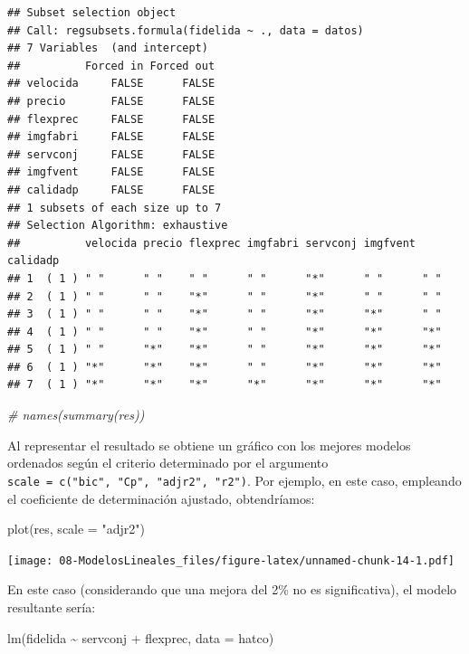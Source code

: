 \documentclass[
]{book}
\newenvironment{Shaded}{\begin{snugshade}}{\end{snugshade}}
\newcommand{\AttributeTok}[1]{\textcolor[rgb]{0.77,0.63,0.00}{#1}}
\newcommand{\CommentTok}[1]{\textcolor[rgb]{0.56,0.35,0.01}{\textit{#1}}}
\newcommand{\FunctionTok}[1]{\textcolor[rgb]{0.00,0.00,0.00}{#1}}
\newcommand{\NormalTok}[1]{#1}
\newcommand{\SpecialCharTok}[1]{\textcolor[rgb]{0.00,0.00,0.00}{#1}}
\newcommand{\StringTok}[1]{\textcolor[rgb]{0.31,0.60,0.02}{#1}}
\theoremstyle{break}
\theoremstyle{nonumberplain}
\begin{document}
\begin{verbatim}
## Subset selection object
## Call: regsubsets.formula(fidelida ~ ., data = datos)
## 7 Variables  (and intercept)
##          Forced in Forced out
## velocida     FALSE      FALSE
## precio       FALSE      FALSE
## flexprec     FALSE      FALSE
## imgfabri     FALSE      FALSE
## servconj     FALSE      FALSE
## imgfvent     FALSE      FALSE
## calidadp     FALSE      FALSE
## 1 subsets of each size up to 7
## Selection Algorithm: exhaustive
##          velocida precio flexprec imgfabri servconj imgfvent calidadp
## 1  ( 1 ) " "      " "    " "      " "      "*"      " "      " "     
## 2  ( 1 ) " "      " "    "*"      " "      "*"      " "      " "     
## 3  ( 1 ) " "      " "    "*"      " "      "*"      "*"      " "     
## 4  ( 1 ) " "      " "    "*"      " "      "*"      "*"      "*"     
## 5  ( 1 ) " "      "*"    "*"      " "      "*"      "*"      "*"     
## 6  ( 1 ) "*"      "*"    "*"      " "      "*"      "*"      "*"     
## 7  ( 1 ) "*"      "*"    "*"      "*"      "*"      "*"      "*"
\end{verbatim}

\begin{Shaded}
\begin{Highlighting}[]
\CommentTok{\# names(summary(res))}
\end{Highlighting}
\end{Shaded}

Al representar el resultado se obtiene un gráfico con los mejores modelos ordenados
según el criterio determinado por el argumento \texttt{scale\ =\ c("bic",\ "Cp",\ "adjr2",\ "r2")}.
Por ejemplo, en este caso, empleando el coeficiente de determinación ajustado, obtendríamos:

\begin{Shaded}
\begin{Highlighting}[]
\FunctionTok{plot}\NormalTok{(res, }\AttributeTok{scale =} \StringTok{"adjr2"}\NormalTok{)}
\end{Highlighting}
\end{Shaded}

\texttt{[image: 08-ModelosLineales\_files/figure-latex/unnamed-chunk-14-1.pdf]}

En este caso (considerando que una mejora del 2\% no es significativa), el modelo resultante sería:

\begin{Shaded}
\begin{Highlighting}[]
\FunctionTok{lm}\NormalTok{(fidelida }\SpecialCharTok{\textasciitilde{}}\NormalTok{ servconj }\SpecialCharTok{+}\NormalTok{ flexprec, }\AttributeTok{data =}\NormalTok{ hatco)}
\end{Highlighting}
\end{Shaded}
\end{document}
